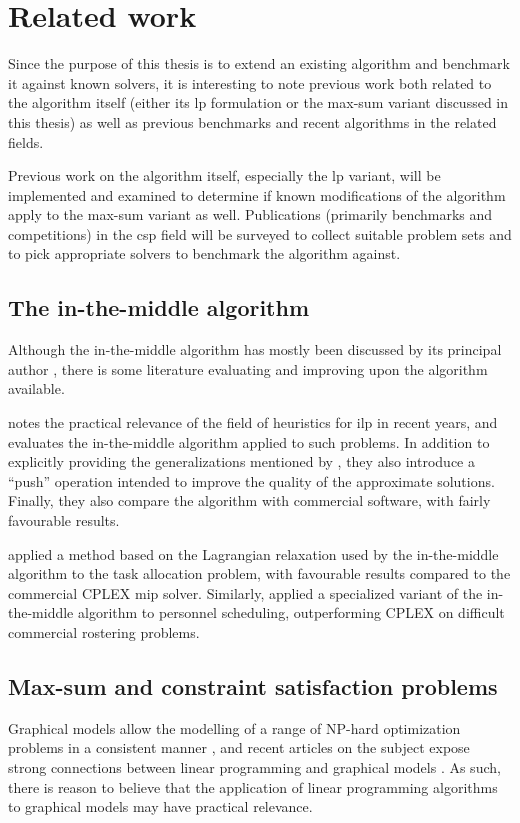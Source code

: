 \section{Related work}
Since the purpose of this thesis is to extend an existing algorithm and benchmark it against known solvers, it is interesting to note previous work both related to the algorithm itself (either its \gls{lp} formulation or the max-sum variant discussed in this thesis) as well as previous benchmarks and recent algorithms in the related fields.

Previous work on the algorithm itself, especially the \gls{lp} variant, will be implemented and examined to determine if known modifications of the algorithm apply to the max-sum variant as well.
Publications (primarily benchmarks and competitions) in the \gls{csp} field will be surveyed to collect suitable problem sets and to pick appropriate solvers to benchmark the algorithm against.

\subsection{The in-the-middle algorithm}
Although the in-the-middle algorithm has mostly been discussed by its principal author \parencites{Wedelin95}{Wedelin08}{Wedelin13}{Alefragis00}, there is some literature evaluating and improving upon the algorithm available.

\Textcite{Bastert10} notes the practical relevance of the field of heuristics for \gls{ilp} in recent years, and evaluates the in-the-middle algorithm applied to such problems. In addition to explicitly providing the generalizations mentioned by \textcite{Wedelin95}, they also introduce a \enquote{push} operation intended to improve the quality of the approximate solutions. Finally, they also compare the algorithm with commercial software, with fairly favourable results.

\Textcite{Ernst05} applied a method based on the Lagrangian relaxation used by the in-the-middle algorithm to the task allocation problem, with favourable results compared to the commercial CPLEX \gls{mip} solver.
Similarly, \textcite{Mason01} applied a specialized variant of the in-the-middle algorithm to personnel scheduling, outperforming CPLEX on difficult commercial rostering problems.

\subsection{Max-sum and constraint satisfaction problems}
Graphical models allow the modelling of a range of NP-hard optimization problems in a consistent manner \parencite{deGivry14}, and recent articles on the subject expose strong connections between linear programming and graphical models \parencites{Werner07}{Kolmogorov13}.
As such, there is reason to believe that the application of linear programming algorithms to graphical models may have practical relevance.

